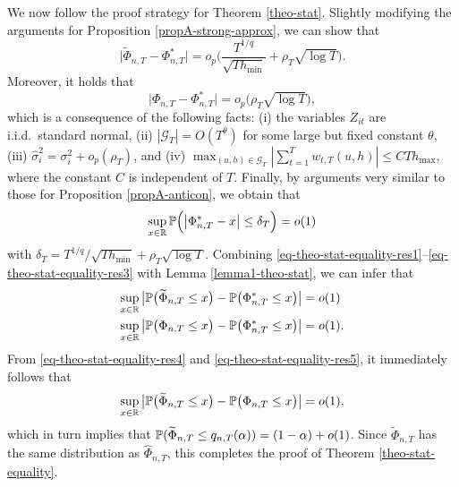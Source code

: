 \documentclass[a4paper,12pt]{article}
\begin{document}
We now follow the proof strategy for Theorem \ref{theo-stat}. Slightly modifying the arguments for Proposition \ref{propA-strong-approx}, we can show that 
\begin{equation}\label{eq-theo-stat-equality-res1}
\big| \widetilde{\Phi}_{n,T} - \Phi_{n,T}^* \big| = o_p \Big( \frac{T^{1/q}}{\sqrt{T h_{\min}}} + \rho_T \sqrt{\log T} \Big). 
\end{equation}
Moreover, it holds that 
\begin{equation}\label{eq-theo-stat-equality-res2}
\big| \Phi_{n,T} - \Phi_{n,T}^* \big| = o_p \big( \rho_T \sqrt{\log T} \big), 
\end{equation}
which is a consequence of the following facts: (i) the variables $Z_{it}$ are i.i.d.\ standard normal, (ii) $|\mathcal{G}_T| = O(T^\theta)$ for some large but fixed constant $\theta$, (iii) $\widehat{\sigma}_i^2 = \sigma_i^2 + o_p(\rho_T)$, and (iv) $\max_{(u,h) \in \mathcal{G}_T} | \sum_{t=1}^T w_{t,T}(u,h) | \le C T h_{\max}$, where the constant $C$ is independent of $T$. Finally, by arguments very similar to those for Proposition \ref{propA-anticon}, we obtain that 
\begin{equation}\label{eq-theo-stat-equality-res3}
\sup_{x \in \mathbb{R}} \mathbb{P} \Big( \big| \Phi_{n,T}^* - x \big| \le \delta_T \Big) = o(1) 
\end{equation}
with $\delta_T = T^{1/q} / \sqrt{T h_{\min}} + \rho_T \sqrt{\log T}$. Combining \eqref{eq-theo-stat-equality-res1}--\eqref{eq-theo-stat-equality-res3} with Lemma \ref{lemma1-theo-stat}, we can infer that 
\begin{align}
\sup_{x \in \mathbb{R}} \big| \mathbb{P} \big( \widetilde{\Phi}_{n,T} \le x \big) -  \mathbb{P} \big( \Phi_{n,T}^* \le x \big) \big| & = o(1) \label{eq-theo-stat-equality-res4} \\
\sup_{x \in \mathbb{R}} \big| \mathbb{P} \big( \Phi_{n,T} \le x \big) -  \mathbb{P} \big( \Phi_{n,T}^* \le x \big) \big| & = o(1). \label{eq-theo-stat-equality-res5}
\end{align}
From \eqref{eq-theo-stat-equality-res4} and \eqref{eq-theo-stat-equality-res5}, it immediately follows that 
\[ \sup_{x \in \mathbb{R}} \big| \mathbb{P} \big( \widetilde{\Phi}_{n,T} \le x \big) -  \mathbb{P} \big( \Phi_{n,T} \le x \big) \big| = o(1), \]
which in turn implies that $\mathbb{P} ( \widetilde{\Phi}_{n,T} \le q_{n,T}(\alpha) ) = (1 - \alpha) + o(1)$. Since $\widetilde{\Phi}_{n,T}$ has the same distribution as $\widehat{\Phi}_{n,T}$, this completes the proof of Theorem \ref{theo-stat-equality}. 
\end{document}
